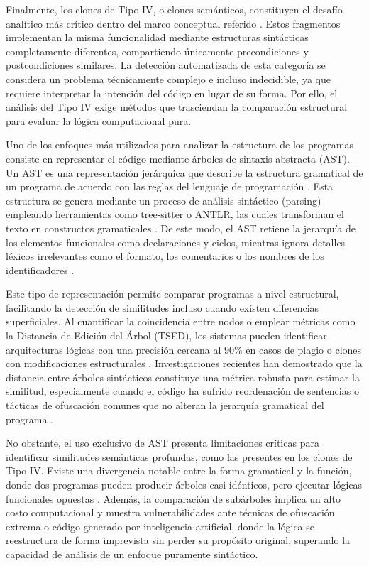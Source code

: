 Finalmente, los clones de Tipo IV, o clones semánticos, constituyen el desafío analítico más crítico dentro del marco conceptual referido \cite{Bellon2007Comparison}. Estos fragmentos implementan la misma funcionalidad mediante estructuras sintácticas completamente diferentes, compartiendo únicamente precondiciones y postcondiciones similares. La detección automatizada de esta categoría se considera un problema técnicamente complejo e incluso indecidible, ya que requiere interpretar la intención del código en lugar de su forma. Por ello, el análisis del Tipo IV \cite{Bellon2007Comparison} exige métodos que trasciendan la comparación estructural para evaluar la lógica computacional pura.

Uno de los enfoques más utilizados para analizar la estructura de los programas consiste en representar el código mediante árboles de sintaxis abstracta (AST). Un AST es una representación jerárquica que describe la estructura gramatical de un programa de acuerdo con las reglas del lenguaje de programación \cite{Pradeep2025AntiPlagiarism}. Esta estructura se genera mediante un proceso de análisis sintáctico (parsing) empleando herramientas como tree-sitter o ANTLR, las cuales transforman el texto en constructos gramaticales \cite{Song2024AST}. De este modo, el AST retiene la jerarquía de los elementos funcionales como declaraciones y ciclos, mientras ignora detalles léxicos irrelevantes como el formato, los comentarios o los nombres de los identificadores \cite{Pradeep2025AntiPlagiarism}.

Este tipo de representación permite comparar programas a nivel estructural, facilitando la detección de similitudes incluso cuando existen diferencias superficiales. Al cuantificar la coincidencia entre nodos o emplear métricas como la Distancia de Edición del Árbol (TSED), los sistemas pueden identificar arquitecturas lógicas con una precisión cercana al 90\% en casos de plagio o clones con modificaciones estructurales \cite{Pradeep2025AntiPlagiarism}. Investigaciones recientes han demostrado que la distancia entre árboles sintácticos constituye una métrica robusta para estimar la similitud, especialmente cuando el código ha sufrido reordenación de sentencias o tácticas de ofuscación comunes que no alteran la jerarquía gramatical del programa \cite{Song2024AST}.

No obstante, el uso exclusivo de AST presenta limitaciones críticas para identificar similitudes semánticas profundas, como las presentes en los clones de Tipo IV. Existe una divergencia notable entre la forma gramatical y la función, donde dos programas pueden producir árboles casi idénticos, pero ejecutar lógicas funcionales opuestas \cite{Song2024AST}. Además, la comparación de subárboles implica un alto costo computacional y muestra vulnerabilidades ante técnicas de ofuscación extrema o código generado por inteligencia artificial, donde la lógica se reestructura de forma imprevista sin perder su propósito original, superando la capacidad de análisis de un enfoque puramente sintáctico.

